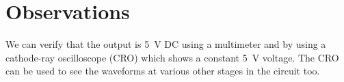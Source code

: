 \documentclass[journal,12pt,twocolumn]{IEEEtran}
\numberwithin{equation}{section}
\numberwithin{figure}{section}
\begin{document}
	\section{Observations}
	We can verify that the output is \SI{5}{\volt} DC using a multimeter and by using a cathode-ray oscilloscope (CRO) which shows a constant \SI{5}{\volt} voltage. The CRO can be used to see the waveforms at various other stages in the circuit too.

	
	
\end{document}
